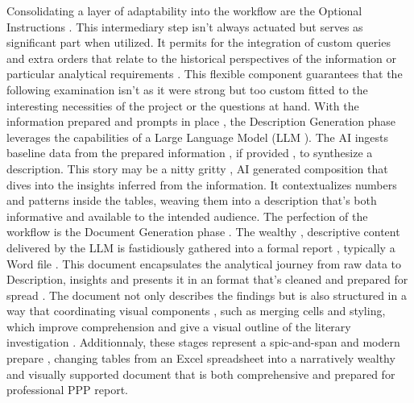\vskip 0.5cm
Consolidating a layer of adaptability into the workflow are the Optional Instructions . This intermediary step isn't always actuated but serves as significant part when utilized. It permits for the integration of custom queries and extra orders that relate to the historical perspectives of the information or particular analytical requirements . This flexible component guarantees that the following examination isn't as it were strong but too custom fitted to the interesting necessities of the project or the questions at hand.
\vskip 0.5cm
With the information prepared and prompts in place , the Description Generation phase leverages the capabilities of a Large Language Model (LLM ). The AI ingests baseline data from the prepared information , if provided , to synthesize a description. This story may be a nitty gritty , AI generated composition that dives into the insights inferred from the information. It contextualizes numbers and patterns inside the tables, weaving them into a description that's both informative and available to the intended audience.
\vskip 0.5cm
The perfection of the workflow is the Document Generation phase . The wealthy , descriptive content delivered by the LLM is  fastidiously gathered into a formal report , typically a Word file . This document encapsulates the analytical journey from raw data to Description, insights and presents it in an format that's cleaned and prepared for spread . The document not only describes the findings but is also structured in a way that coordinating visual components , such as merging cells and styling, which improve comprehension and give a visual outline of the literary investigation .
\vskip 0.5cm
Additionnaly, these stages represent a spic-and-span and modern prepare , changing tables from an Excel spreadsheet into a narratively wealthy and visually supported document that is both comprehensive and prepared for professional PPP report.
    
    
